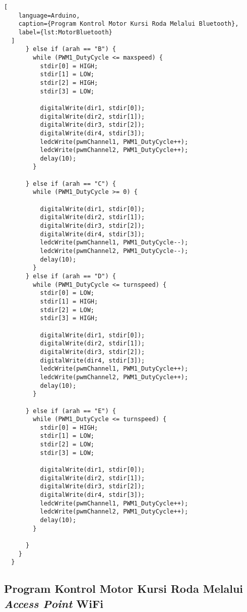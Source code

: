 \begin{lstlisting}[
    language=Arduino,
    caption={Program Kontrol Motor Kursi Roda Melalui Bluetooth},
    label={lst:MotorBluetooth}
  ]
      } else if (arah == "B") {
        while (PWM1_DutyCycle <= maxspeed) {
          stdir[0] = HIGH;
          stdir[1] = LOW;
          stdir[2] = HIGH;
          stdir[3] = LOW;
  
          digitalWrite(dir1, stdir[0]);
          digitalWrite(dir2, stdir[1]);
          digitalWrite(dir3, stdir[2]);
          digitalWrite(dir4, stdir[3]);
          ledcWrite(pwmChannel1, PWM1_DutyCycle++);
          ledcWrite(pwmChannel2, PWM1_DutyCycle++);
          delay(10);
        }
  
      } else if (arah == "C") {
        while (PWM1_DutyCycle >= 0) {
  
          digitalWrite(dir1, stdir[0]);
          digitalWrite(dir2, stdir[1]);
          digitalWrite(dir3, stdir[2]);
          digitalWrite(dir4, stdir[3]);
          ledcWrite(pwmChannel1, PWM1_DutyCycle--);
          ledcWrite(pwmChannel2, PWM1_DutyCycle--);
          delay(10);
        }
      } else if (arah == "D") {
        while (PWM1_DutyCycle <= turnspeed) {
          stdir[0] = LOW;
          stdir[1] = HIGH;
          stdir[2] = LOW;
          stdir[3] = HIGH;
  
          digitalWrite(dir1, stdir[0]);
          digitalWrite(dir2, stdir[1]);
          digitalWrite(dir3, stdir[2]);
          digitalWrite(dir4, stdir[3]);
          ledcWrite(pwmChannel1, PWM1_DutyCycle++);
          ledcWrite(pwmChannel2, PWM1_DutyCycle++);
          delay(10);
        }
  
      } else if (arah == "E") {
        while (PWM1_DutyCycle <= turnspeed) {
          stdir[0] = HIGH;
          stdir[1] = LOW;
          stdir[2] = LOW;
          stdir[3] = LOW;
  
          digitalWrite(dir1, stdir[0]);
          digitalWrite(dir2, stdir[1]);
          digitalWrite(dir3, stdir[2]);
          digitalWrite(dir4, stdir[3]);
          ledcWrite(pwmChannel1, PWM1_DutyCycle++);
          ledcWrite(pwmChannel2, PWM1_DutyCycle++);
          delay(10);
        }
  
      }
    }
  }  
  \end{lstlisting}

\subsection{Program Kontrol Motor Kursi Roda Melalui \emph{Access Point} WiFi}

